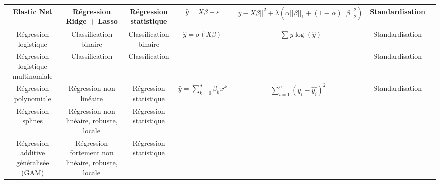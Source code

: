\begin{table}[h!]
\begin{tabularx}{\textwidth}{|C|C|C|C|C|C|C|}
Elastic Net                                        & Régression Ridge + Lasso                                                                  & Régression statistique               & $\hat{y} = X\beta + \varepsilon$                                                & $||y-X\beta||^2 + \lambda(\alpha ||\beta||_1 +(1-\alpha)||\beta||_2^2)$                            & Standardisation \\
\hline

Régression logistique                              & Classification binaire                                                                    & Classification binaire               & $\hat{y} = \sigma(X\beta)$                                                      & $-\sum y\log(\hat y)$                                                                              & Standardisation \\
\hline

Régression logistique multinomiale                 & Classification                                                                            & Classification                       &                                                                                 &                                                                                                    & Standardisation \\
\hline

Régression polynomiale                             & Régression non linéaire                                                                   & Régression statistique               & $\hat{y} = \sum_{k=0}^{d} \beta_k x^k$                                          & $\sum_{i=1}^{n}(y_i - \hat{y_i})^2$                                                                & Standardisation \\
\hline

Régression splines                                 & Régression non linéaire, robuste, locale                                                  & Régression statistique               &                                                                                 &                                                                                                    & -               \\
\hline

Régression additive généralisée (GAM)              & Régression fortement non linéaire, robuste, locale                                        & Régression statistique               &                                                                                 &                                                                                                    & -               \\
\hline


\end{tabularx}
\end{table}

